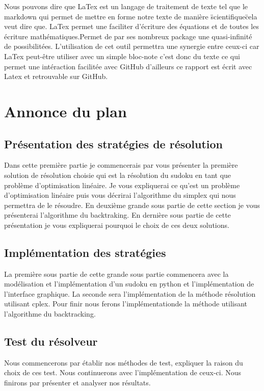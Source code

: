 Nous pouvons dire que LaTex est un langage de traitement de texte tel que le markdown qui permet de mettre en forme notre texte de manière \"scientifique\" cela veut dire que. LaTex permet une faciliter d'écriture des équations et de toutes les écriture mathématiques.Permet de par ses nombreux package une quasi-infinité de possibilitées.
L'utilisation de cet outil permettra une synergie entre ceux-ci car LaTex peut-être utiliser avec un simple bloc-note c'est donc du texte ce qui permet une intéraction facilitée avec GitHub d'ailleurs ce rapport est écrit avec Latex et retrouvable sur GitHub.\newline


\hypertarget{Annonce du plan}{%
\section{Annonce du plan}\label{annonce du plan}}

\subsection{Présentation des stratégies de résolution}

Dans cette première partie je commencerais par vous présenter la première solution de résolution choisie qui est la résolution du sudoku en tant que problème d'optimisation linéaire.\newline
Je vous expliquerai ce qu'est un problème d'optimisation linéaire puis vous décrirai l'algorithme du simplex qui nous permettra de le résoudre.\newline
En deuxième grande sous partie de cette section je vous présenterai l'algorithme du backtraking.\newline
En dernière sous partie de cette présentation je vous expliquerai pourquoi le choix de ces deux solutions.
\subsection{Implémentation des stratégies}
La première sous partie de cette grande sous partie commencera avec la modélisation et l'implémentation d'un sudoku en python et l'implémentation de l'interface graphique.\newline
La seconde sera l'implémentation de la méthode résolution utilisant cplex.\newline
Pour finir nous ferons l'implémentationde la méthode utilisant l'algorithme du backtracking.\newline
\subsection{Test du résolveur}
Nous commencerons par établir nos méthodes de test, expliquer la raison du choix de ces test.\newline
Nous continuerons avec l'implémentation de ceux-ci.\newline
Nous finirons par présenter et analyser nos résultats.\newline
